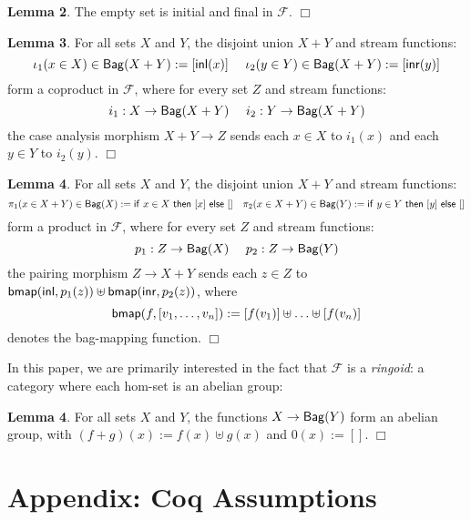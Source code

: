 \documentclass{article}
\begin{document}
{\bf Lemma 2}. The empty set is initial and final in $\mathcal{F}$. \hfill $\Box$

{\bf Lemma 3}. For all sets $X$ and $Y$, the disjoint union $X+Y$ and stream functions: $$\iota_1(x \in X) \in {\sf Bag}(X+Y) := [{\sf inl}(x)] \ \ \ \ \iota_2(y \in Y) \in {\sf Bag}(X+Y) := [{\sf inr}(y)]$$ form a coproduct in $\mathcal{F}$, where for every set $Z$ and stream functions: $$i_1 : X \to {\sf Bag}(X+Y) \ \ \ \ i_2 : Y \to {\sf Bag}(X+Y)$$ the case analysis morphism $X+Y \to Z$ sends each $x \in X$ to $i_1(x)$ and each $y \in Y$ to $i_2(y)$. \hfill $\Box$

{\bf Lemma 4}. For all sets $X$ and $Y$, the disjoint union $X+Y$ and stream functions: $$\pi_1(x \in X+Y) \in {\sf Bag}(X) := {\sf if } \ x \in X \ {\sf then} \ [x] \ {\sf else} \ [] \ \ \ \pi_2(x \in X+Y) \in {\sf Bag}(Y) := {\sf if} \ y \in Y \ {\sf then} \ [y] \ {\sf else} \ []$$ form a product in $\mathcal{F}$, where for every set $Z$ and stream functions: $$p_1 : Z \to {\sf Bag}(X) \ \ \ \  p_2 : Z \to {\sf Bag}(Y)$$ the pairing morphism $Z \to X+Y$ sends each $z \in Z$ to ${\sf bmap}({\sf inl}, p_1(z)) \uplus {\sf bmap}({\sf inr}, p_2(z))$, where $${\sf bmap}(f,[v_1, \ldots, v_n]) := [f(v_1)] \uplus \ldots \uplus [f(v_n)]$$ denotes the bag-mapping function. \hfill $\Box$

In this paper, we are primarily interested in the fact that $\mathcal{F}$ is a {\it ringoid}: a category where each hom-set is an abelian group:

{\bf Lemma 4}.  For all sets $X$ and $Y$, the functions $X \to {\sf Bag}(Y)$ form an abelian group, with $(f+g)(x) := f(x) \uplus g(x)$ and $0(x) := []$.  \hfill $\Box$






 





\section{Appendix: Coq Assumptions}
\end{document}
